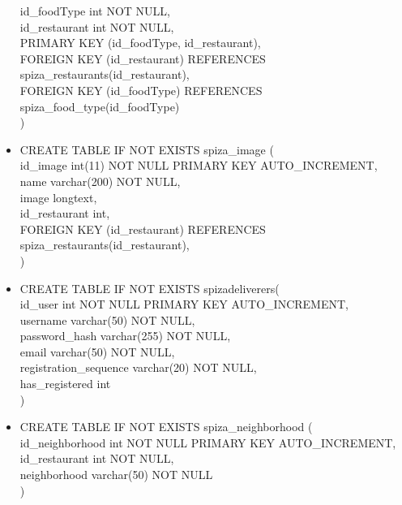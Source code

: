 \documentclass[12pt]{scrartcl}
\begin{document}
\begin{itemize}
    id\_foodType int NOT NULL,\\
    id\_restaurant int NOT NULL,\\
    PRIMARY KEY (id\_foodType, id\_restaurant),\\
    FOREIGN KEY (id\_restaurant) REFERENCES spiza\_restaurants(id\_restaurant),\\
    FOREIGN KEY (id\_foodType) REFERENCES spiza\_food\_type(id\_foodType)\\
    )
    \item[] CREATE TABLE IF NOT EXISTS spiza\_image (\\
    id\_image int(11) NOT NULL PRIMARY KEY AUTO\_INCREMENT,\\
    name varchar(200) NOT NULL,\\
    image longtext,\\
    id\_restaurant int,\\
    FOREIGN KEY (id\_restaurant) REFERENCES spiza\_restaurants(id\_restaurant),\\
    )
    \item[] CREATE TABLE IF NOT EXISTS spiza\textunderscore deliverers( \\
    id\_user int NOT NULL PRIMARY KEY AUTO\_INCREMENT,\\
    username varchar(50) NOT NULL,\\
    password\_hash varchar(255) NOT NULL,\\
    email varchar(50) NOT NULL,\\
    registration\_sequence varchar(20) NOT NULL,
    \\has\_registered int\\
    )
    \item[] CREATE TABLE IF NOT EXISTS spiza\_neighborhood (\\
    id\_neighborhood int NOT NULL PRIMARY KEY AUTO\_INCREMENT,\\
    id\_restaurant int NOT NULL,\\
    neighborhood varchar(50) NOT NULL\\
    )
\end{itemize}
\end{document}
